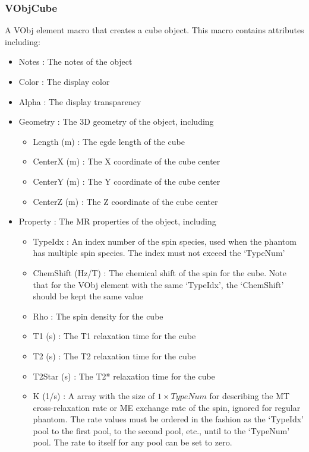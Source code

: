 \documentclass{book}%
\begin{document}
\subsubsection{VObjCube}

A VObj element macro that creates a cube object. This macro contains attributes including:

\begin{itemize}
	\item Notes : The notes of the object
	\item Color : The display color
	\item Alpha : The display transparency
	\item Geometry : The 3D geometry of the object, including
	\begin{itemize}
		\item Length (m) : The egde length of the cube
		\item CenterX (m) : The X coordinate of the cube center
		\item CenterY (m) : The Y coordinate of the cube center
		\item CenterZ (m) : The Z coordinate of the cube center
	\end{itemize}
	\item Property : The MR properties of the object, including
	\begin{itemize}
		\item TypeIdx : An index number of the spin species, used when the phantom has multiple spin species. The index must not exceed the `TypeNum'
		\item ChemShift (Hz/T) : The chemical shift of the spin for the cube. Note that for the VObj element with the same `TypeIdx', the `ChemShift' should be kept the same value
		\item Rho : The spin density for the cube
		\item T1 (s) : The T1 relaxation time for the cube
		\item T2 (s) : The T2 relaxation time for the cube
		\item T2Star (s) : The T2* relaxation time for the cube
		\item K (1/s) : A array with the size of $1 \times TypeNum$ for describing the MT cross-relaxation rate or ME exchange rate of the spin, ignored for regular phantom. The rate values must be ordered in the fashion as the `TypeIdx' pool to the first pool, to the second pool, etc., until to the `TypeNum' pool. The rate to itself for any pool can be set to zero.
	\end{itemize}
\end{itemize}
\end{document}
